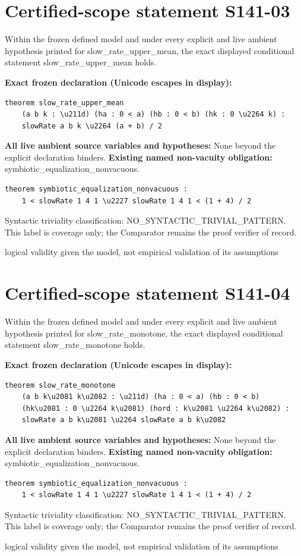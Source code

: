 \documentclass[11pt]{article}
\begin{document}
\section*{Certified-scope statement S141-03}
Within the frozen defined model and under every explicit and live ambient hypothesis printed for slow\_rate\_upper\_mean, the exact displayed conditional statement slow\_rate\_upper\_mean holds.
\par\noindent\textbf{Exact frozen declaration (Unicode escapes in display):}
\begin{verbatim}
theorem slow_rate_upper_mean
    (a b k : \u211d) (ha : 0 < a) (hb : 0 < b) (hk : 0 \u2264 k) :
    slowRate a b k \u2264 (a + b) / 2
\end{verbatim}
\noindent\textbf{All live ambient source variables and hypotheses:}
None beyond the explicit declaration binders.
\noindent\textbf{Existing named non-vacuity obligation:} symbiotic\_equalization\_nonvacuous.
\begin{verbatim}
theorem symbiotic_equalization_nonvacuous :
    1 < slowRate 1 4 1 \u2227 slowRate 1 4 1 < (1 + 4) / 2
\end{verbatim}
\noindent Syntactic triviality classification: NO\_SYNTACTIC\_TRIVIAL\_PATTERN. This label is coverage only; the Comparator remains the proof verifier of record.
\par\noindent logical validity given the model, not empirical validation of its assumptions
\section*{Certified-scope statement S141-04}
Within the frozen defined model and under every explicit and live ambient hypothesis printed for slow\_rate\_monotone, the exact displayed conditional statement slow\_rate\_monotone holds.
\par\noindent\textbf{Exact frozen declaration (Unicode escapes in display):}
\begin{verbatim}
theorem slow_rate_monotone
    (a b k\u2081 k\u2082 : \u211d) (ha : 0 < a) (hb : 0 < b)
    (hk\u2081 : 0 \u2264 k\u2081) (hord : k\u2081 \u2264 k\u2082) :
    slowRate a b k\u2081 \u2264 slowRate a b k\u2082
\end{verbatim}
\noindent\textbf{All live ambient source variables and hypotheses:}
None beyond the explicit declaration binders.
\noindent\textbf{Existing named non-vacuity obligation:} symbiotic\_equalization\_nonvacuous.
\begin{verbatim}
theorem symbiotic_equalization_nonvacuous :
    1 < slowRate 1 4 1 \u2227 slowRate 1 4 1 < (1 + 4) / 2
\end{verbatim}
\noindent Syntactic triviality classification: NO\_SYNTACTIC\_TRIVIAL\_PATTERN. This label is coverage only; the Comparator remains the proof verifier of record.
\par\noindent logical validity given the model, not empirical validation of its assumptions
\end{document}
